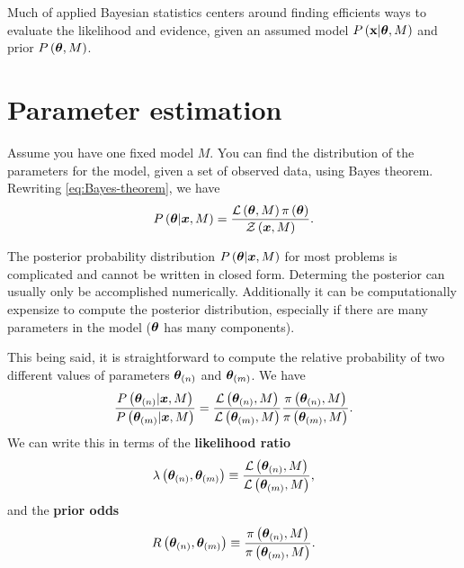 Much of applied Bayesian statistics centers around finding efficients ways
to evaluate the likelihood and evidence, given an assumed model
$P\left({\bf x}|{\bm \theta},M\right)$ and prior $P\left({\bm \theta},M\right)$.

\section{Parameter estimation}

Assume you have one fixed model $M$. You can find the distribution
of the parameters for the model, given a set of observed data, using Bayes theorem. 
Rewriting \eqref{eq:Bayes-theorem}, we have 
\begin{align}
    P\left({\bm \theta}|{\bm x},M\right)
    =
    \frac{
        \mathcal{L}\left({\bm \theta},M\right)\pi\left({\bm \theta}\right)
    }{
        \mathcal{Z}\left({\bm x},M\right)
    }
    .
\end{align}

The posterior probability distribution $P\left({\bm \theta}|{\bm x},M\right)$ for most problems is 
complicated and cannot be written in closed form.
Determing the posterior can usually only be accomplished numerically.
Additionally it can be computationally expensize to compute the posterior distribution,
especially if there are many parameters in the model (${\bm \theta}$ has many components). 

This being said, it is straightforward to compute the relative probability of two
different values of parameters ${\bm \theta}_{(n)}$ and ${\bm \theta}_{(m)}$.
We have
\begin{align}
    \frac{
        P\left({\bm \theta}_{(n)}|{\bm x},M\right)
    }{
        P\left({\bm \theta}_{(m)}|{\bm x},M\right)
    }
    =
    \frac{
        \mathcal{L}\left({\bm \theta}_{(n)},M\right) 
    }{
        \mathcal{L}\left({\bm \theta}_{(m)},M\right) 
    }
    \frac{
        \pi\left({\bm \theta}_{(n)},M\right)
    }{
        \pi\left({\bm \theta}_{(m)},M\right)
    }
    .
\end{align}
We can write this in terms of the \textbf{likelihood ratio}
\begin{align}
    \lambda\left({\bm \theta}_{(n)},{\bm \theta}_{(m)}\right)
    \equiv
    \frac{
        \mathcal{L}\left({\bm \theta}_{(n)},M\right) 
    }{
        \mathcal{L}\left({\bm \theta}_{(m)},M\right) 
    }
    ,
\end{align}
and the \textbf{prior odds}
\begin{align}
    R\left({\bm \theta}_{(n)},{\bm \theta}_{(m)}\right)
    \equiv
    \frac{
        \pi\left({\bm \theta}_{(n)},M\right)
    }{
        \pi\left({\bm \theta}_{(m)},M\right)
    }
    .
\end{align}

